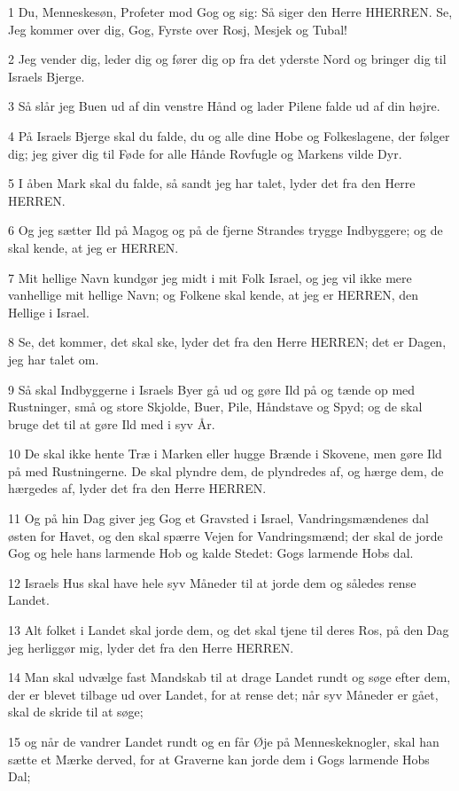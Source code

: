 \par 1 Du, Menneskesøn, Profeter mod Gog og sig: Så siger den Herre HHERREN. Se, Jeg kommer over dig, Gog, Fyrste over Rosj, Mesjek og Tubal!
\par 2 Jeg vender dig, leder dig og fører dig op fra det yderste Nord og bringer dig til Israels Bjerge.
\par 3 Så slår jeg Buen ud af din venstre Hånd og lader Pilene falde ud af din højre.
\par 4 På Israels Bjerge skal du falde, du og alle dine Hobe og Folkeslagene, der følger dig; jeg giver dig til Føde for alle Hånde Rovfugle og Markens vilde Dyr.
\par 5 I åben Mark skal du falde, så sandt jeg har talet, lyder det fra den Herre HERREN.
\par 6 Og jeg sætter Ild på Magog og på de fjerne Strandes trygge Indbyggere; og de skal kende, at jeg er HERREN.
\par 7 Mit hellige Navn kundgør jeg midt i mit Folk Israel, og jeg vil ikke mere vanhellige mit hellige Navn; og Folkene skal kende, at jeg er HERREN, den Hellige i Israel.
\par 8 Se, det kommer, det skal ske, lyder det fra den Herre HERREN; det er Dagen, jeg har talet om.
\par 9 Så skal Indbyggerne i Israels Byer gå ud og gøre Ild på og tænde op med Rustninger, små og store Skjolde, Buer, Pile, Håndstave og Spyd; og de skal bruge det til at gøre Ild med i syv År.
\par 10 De skal ikke hente Træ i Marken eller hugge Brænde i Skovene, men gøre Ild på med Rustningerne. De skal plyndre dem, de plyndredes af, og hærge dem, de hærgedes af, lyder det fra den Herre HERREN.
\par 11 Og på hin Dag giver jeg Gog et Gravsted i Israel, Vandringsmændenes dal østen for Havet, og den skal spærre Vejen for Vandringsmænd; der skal de jorde Gog og hele hans larmende Hob og kalde Stedet: Gogs larmende Hobs dal.
\par 12 Israels Hus skal have hele syv Måneder til at jorde dem og således rense Landet.
\par 13 Alt folket i Landet skal jorde dem, og det skal tjene til deres Ros, på den Dag jeg herliggør mig, lyder det fra den Herre HERREN.
\par 14 Man skal udvælge fast Mandskab til at drage Landet rundt og søge efter dem, der er blevet tilbage ud over Landet, for at rense det; når syv Måneder er gået, skal de skride til at søge;
\par 15 og når de vandrer Landet rundt og en får Øje på Menneskeknogler, skal han sætte et Mærke derved, for at Graverne kan jorde dem i Gogs larmende Hobs Dal;
